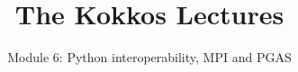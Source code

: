 
\def\sandid{SAND2020-8766 PE}
\usepackage{pgfplotstable}

\title{The Kokkos Lectures}

\author{Module 6: Python interoperability, MPI and PGAS}




\shortfalse
\mediumtrue
\fulltrue
\notoverviewtrue



% 

\begin{frame}
	\titlepage
\end{frame}

